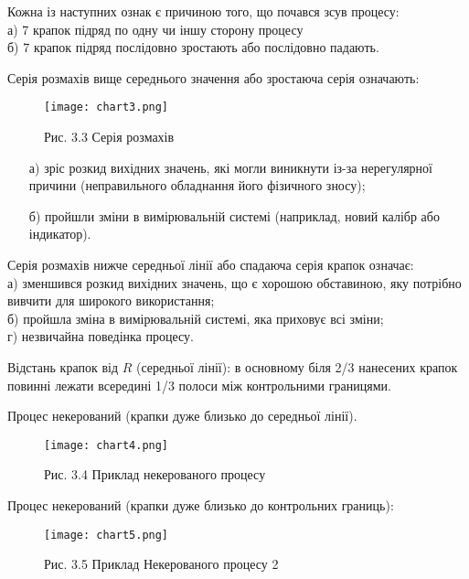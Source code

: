 Кожна із наступних ознак є причиною того, що почався зсув процесу:\\
а) 7 крапок підряд по одну чи іншу сторону процесу\\
б) 7 крапок підряд послідовно зростають або послідовно падають.

Серія розмахів вище середнього значення або зростаюча серія означають:

\begin{figure}[H]
\centering
\texttt{[image: chart3.png]} %
\caption{Рис. 3.3 Серія розмахів}
\label{fig:chart3}
\end{figure}

\begin{itemize}
    \item[а)] зріс розкид вихідних значень, які могли виникнути із-за нерегулярної причини (неправильного обладнання його фізичного зносу);
    \item[б)] пройшли зміни в вимірювальній системі (наприклад, новий калібр або індикатор).
\end{itemize}

Серія розмахів нижче середньої лінії або спадаюча серія крапок означає:\\
а) зменшився розкид вихідних значень, що є хорошою обставиною, яку потрібно вивчити для широкого використання;\\
б) пройшла зміна в вимірювальній системі, яка приховує всі зміни;\\
г) незвичайна поведінка процесу.

Відстань крапок від $R$ (середньої лінії): в основному біля 2/3 нанесених крапок повинні лежати всередині 1/3 полоси між контрольними границями.

Процес некерований (крапки дуже близько до середньої лінії).

\begin{figure}[H]
\centering
\texttt{[image: chart4.png]} %
\caption{Рис. 3.4 Приклад некерованого процесу}
\label{fig:chart4}
\end{figure}

Процес некерований (крапки дуже близько до контрольних границь):

\begin{figure}[H]
\centering
\texttt{[image: chart5.png]} %
\caption{Рис. 3.5 Приклад Некерованого процесу 2}
\label{fig:chart5}
\end{figure}

